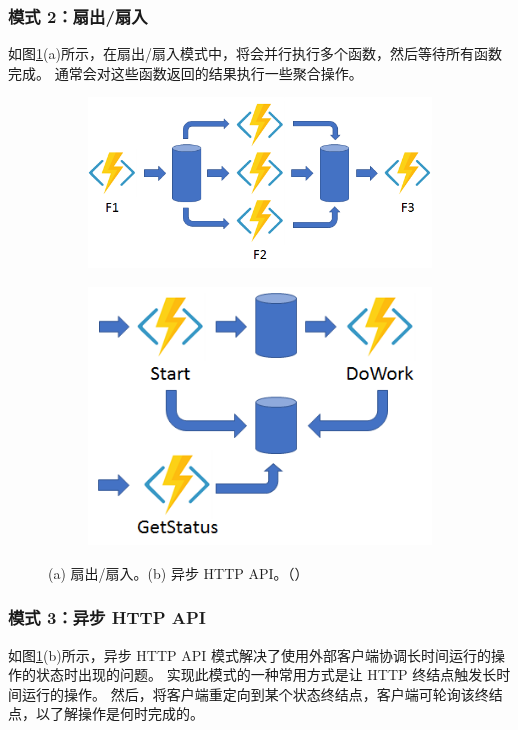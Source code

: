 \documentclass[11pt]{article}
\begin{document}
\subsubsection{模式 2：扇出/扇入}
如图\ref{fig:model2-3}(a)所示，在扇出/扇入模式中，将会并行执行多个函数，然后等待所有函数完成。 通常会对这些函数返回的结果执行一些聚合操作。
\begin{figure}[!htbp]
	\begin{subfigure}[b]{0.62\linewidth}
		\includegraphics[width=\linewidth]{figs/model2}
		\caption{}
	\end{subfigure}
	\begin{subfigure}[b]{0.38\linewidth}
		\includegraphics[width=\linewidth]{figs/model3}
		\caption{}
	\end{subfigure}
	\caption{(a) 扇出/扇入。(b) 异步 HTTP API。（\cite{Durable}）}
	\label{fig:model2-3}
\end{figure}

\subsubsection{模式 3：异步 HTTP API}
如图\ref{fig:model2-3}(b)所示，异步 HTTP API 模式解决了使用外部客户端协调长时间运行的操作的状态时出现的问题。 实现此模式的一种常用方式是让 HTTP 终结点触发长时间运行的操作。 然后，将客户端重定向到某个状态终结点，客户端可轮询该终结点，以了解操作是何时完成的。
\end{document}
